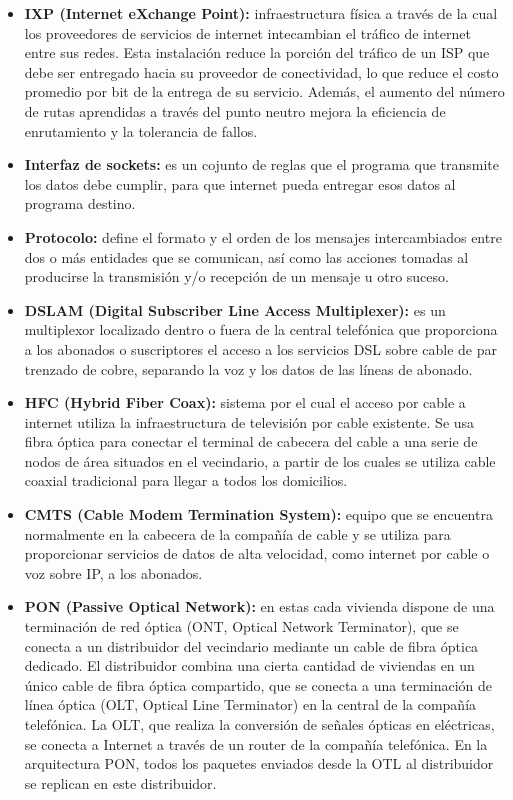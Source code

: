 \documentclass[a4paper,11pt]{article}
\begin{document}
\begin{itemize}
\item \textbf{IXP (Internet eXchange Point):} infraestructura física a través de la cual los proveedores de servicios de internet intecambian el tráfico de internet entre sus redes. Esta instalación reduce la porción del tráfico de un ISP que debe ser entregado hacia su proveedor de conectividad, lo que reduce el costo promedio por bit de la entrega de su servicio. Además, el aumento del número de rutas aprendidas a través del punto neutro mejora la eficiencia de enrutamiento y la tolerancia de fallos.

\item \textbf{Interfaz de sockets:} es un cojunto de reglas que el programa que transmite los datos debe cumplir, para que internet pueda entregar esos datos al programa destino. 

\item \textbf{Protocolo:} define el formato y el orden de los mensajes intercambiados entre dos o más entidades que se comunican, así como las acciones tomadas al producirse la transmisión y/o recepción de un mensaje u otro suceso.

\item \textbf{DSLAM (Digital Subscriber Line Access Multiplexer):} es un multiplexor localizado dentro o fuera de la central telefónica que proporciona a los abonados o suscriptores el acceso a los servicios DSL sobre cable de par trenzado de cobre, separando la voz y los datos de las líneas de abonado.

\item \textbf{HFC (Hybrid Fiber Coax):} sistema por el cual el acceso por cable a internet utiliza la infraestructura de televisión por cable existente. Se usa fibra óptica para conectar el terminal de cabecera del cable a una serie de nodos de área situados en el vecindario, a partir de los cuales se utiliza cable coaxial tradicional para llegar a todos los domicilios.

\item \textbf{CMTS (Cable Modem Termination System):} equipo que se encuentra normalmente en la cabecera de la compañía de cable y se utiliza para proporcionar servicios de datos de alta velocidad, como internet por cable o voz sobre IP, a los abonados.

\item \textbf{PON (Passive Optical Network):} en estas cada vivienda dispone de una terminación de red óptica (ONT, Optical Network Terminator), que se conecta a un distribuidor del vecindario mediante un cable de fibra óptica dedicado. El distribuidor combina una cierta cantidad de viviendas en un único cable de fibra óptica compartido, que se conecta a una terminación de línea óptica (OLT, Optical Line Terminator) en la central de la compañía telefónica. La OLT, que realiza la conversión de señales ópticas en eléctricas, se conecta a Internet a través de un router de la compañía telefónica. En la arquitectura PON, todos los paquetes enviados desde la OTL al distribuidor se replican en este distribuidor.


\end{itemize}
\end{document}
